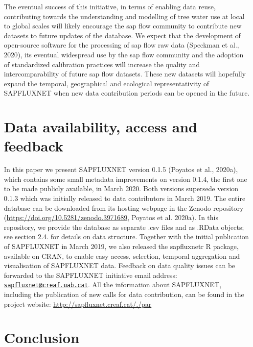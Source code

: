 \documentclass[11pt,twoside]{reedthesis}
\begin{document}
The eventual success of this initiative, in terms of enabling data
reuse, contributing towards the understanding and modelling of tree
water use at local to global scales will likely encourage the sap flow
community to contribute new datasets to future updates of the database.
We expect that the development of open-source software for the
processing of sap flow raw data (Speckman et al., 2020), its eventual
widespread use by the sap flow community and the adoption of
standardized calibration practices will increase the quality and
intercomparability of future sap flow datasets. These new datasets will
hopefully expand the temporal, geographical and ecological
representativity of SAPFLUXNET when new data contribution periods can be
opened in the future.\par

\section{Data availability, access and
feedback}\label{data-availability-access-and-feedback}

In this paper we present SAPFLUXNET version 0.1.5 (Poyatos et al.,
2020a), which contains some small metadata improvements on version
0.1.4, the first one to be made publicly available, in March 2020. Both
versions supersede version 0.1.3 which was initially released to data
contributors in March 2019. The entire database can be downloaded from
its hosting webpage in the Zenodo repository
(\url{https://doi.org/10.5281/zenodo.3971689}, Poyatos et al. 2020a). In
this repository, we provide the database as separate .csv files and as
.RData objects; see section 2.4. for details on data structure. Together
with the initial publication of SAPFLUXNET in March 2019, we also
released the sapfluxnetr R package, available on CRAN, to enable easy
access, selection, temporal aggregation and visualisation of SAPFLUXNET
data. Feedback on data quality issues can be forwarded to the SAPFLUXNET
initiative email address:
\href{mailto:sapfluxnet@creaf.uab.cat}{\nolinkurl{sapfluxnet@creaf.uab.cat}}.
All the information about SAPFLUXNET, including the publication of new
calls for data contribution, can be found in the project website:
\url{http://sapfluxnet.creaf.cat/./par}

\section{Conclusion}\label{conclusion}
\end{document}
